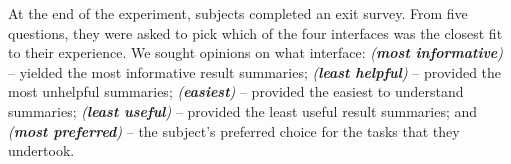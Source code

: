 At the end of the experiment, subjects completed an exit survey. From five questions, they were asked to pick which of the four interfaces was the closest fit to their experience. We sought opinions on what interface: \emph{(\textbf{most informative})} -- yielded the most informative result summaries; \emph{(\textbf{least helpful})} -- provided the most unhelpful summaries; \emph{(\textbf{easiest})} -- provided the easiest to understand summaries; \emph{(\textbf{least useful})} -- provided the least useful result summaries; and \emph{(\textbf{most preferred})} -- the subject's preferred choice for the tasks that they undertook.





